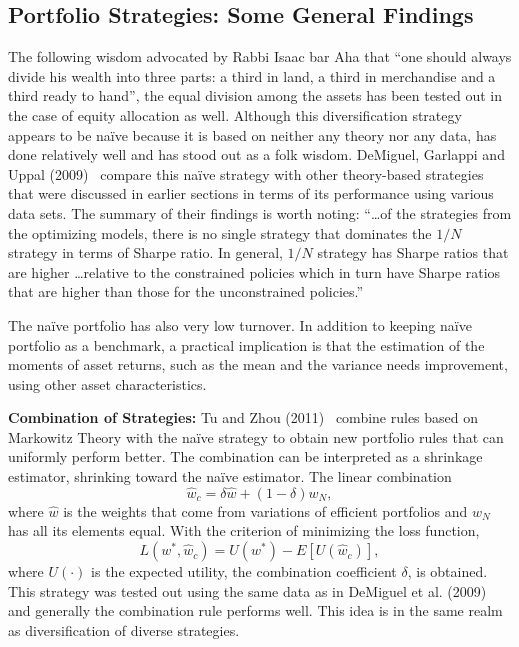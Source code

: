 \subsection{Portfolio Strategies: Some General Findings}

The following wisdom advocated by Rabbi Isaac bar Aha that ``one should always divide his wealth into three parts: a third in land, a third in merchandise and a third ready to hand'', the equal division among the assets has been tested out in the case of equity allocation as well. Although this diversification strategy appears to be na\"ive because it is based on neither any theory nor any data, has done relatively well and has stood out as a folk wisdom. DeMiguel, Garlappi and Uppal (2009)~\cite{demig} compare this na\"ive strategy with other theory-based strategies that were discussed in earlier sections in terms of its performance using various data sets. The summary of their findings is worth noting: ``\dots of the strategies from the optimizing models, there is no single strategy that dominates the $1/N$ strategy in terms of Sharpe ratio. In general, $1/N$ strategy has Sharpe ratios that are higher \dots relative to the constrained policies which in turn have Sharpe ratios that are higher than those for the unconstrained policies.''


The na\"ive portfolio has also very low turnover. In addition to keeping na\"ive portfolio as  a benchmark, a practical implication is that the estimation of the moments of asset returns, such as the mean and the variance needs improvement, using other asset characteristics. \twomedskip


\noindent\textbf{Combination of Strategies:} Tu and Zhou (2011)~\cite{jtu} combine rules based on Markowitz Theory with the na\"ive strategy to obtain new portfolio rules that can uniformly perform better. The combination can be interpreted as a shrinkage estimator, shrinking toward the na\"ive estimator. The linear combination
	\begin{equation} \label{eqn:lincomb}
	\hat{w}_c = \delta \hat{w} + (1-\delta) w_N,
	\end{equation}
where $\hat{w}$ is the weights that come from variations of efficient portfolios and $w_N$ has all its elements equal. With the criterion of minimizing the loss function, 
	\begin{equation} \label{eqn:lossfun}
	L(w^*,\hat{w}_c)= U(w^*) - E[U(\hat{w}_c)],
	\end{equation}
where $U(\cdot)$ is the expected utility, the combination coefficient $\delta$, is obtained. This strategy was tested out using the same data as in DeMiguel et al. (2009)~\cite{demig} and generally the combination rule performs well. This idea is in the same realm as diversification of diverse strategies. \twomedskip


